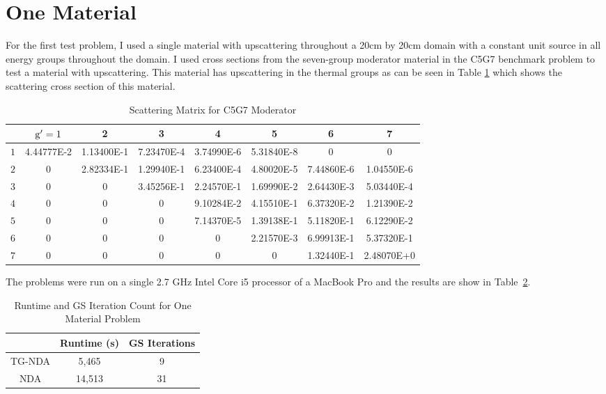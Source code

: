 \section{One Material}
For the first test problem, I used a single material with upscattering throughout a 20cm by 20cm domain with a constant unit source in all energy groups throughout the domain. 
 I used cross sections from the seven-group moderator material in the C5G7 benchmark problem \cite{C5G7} to test a material with upscattering.  This material has upscattering in the thermal groups as can be seen in Table \ref{table:modxs} which shows the scattering cross section of this material.
 \begin{table}[!htb]
\small
\centering
\caption{Scattering Matrix for C5G7 Moderator}
    \label{tab:two}
\begin{center}
    \begin{tabular}{|c|c|c|c|c|c|c|c|}
\hline
 & $\mathrm{g}'=1$ & 2 & 3 & 4 & 5 & 6 & 7 \\ 
\hline
 $1$ & 4.44777E-2 &  1.13400E-1 & 7.23470E-4 & 3.74990E-6 & 5.31840E-8     &  0     &    0  \\
\hline
 $2$  & 0       &    2.82334E-1 & 1.29940E-1 & 6.23400E-4  & 4.80020E-5  & 7.44860E-6 &  1.04550E-6 \\
\hline
 $3$  & 0        &      0  &     3.45256E-1 & 2.24570E-1 & 1.69990E-2 & 2.64430E-3 & 5.03440E-4 \\
\hline
 $4$  & 0          &     0    &       0     &  9.10284E-2 & 4.15510E-1 & 6.37320E-2 & 1.21390E-2 \\
\hline
 $5$  & 0        &       0     &      0     & 7.14370E-5 & 1.39138E-1 & 5.11820E-1 & 6.12290E-2 \\
\hline
$6$  & 0        &       0   &    0      &  0     &  2.21570E-3 & 6.99913E-1 &  5.37320E-1 \\
\hline
$7$  & 0       &        0        &   0      &     0      &     0   &    1.32440E-1 & 2.48070E+0 \\
\hline
    \end{tabular}
\end{center}
\label{table:modxs}
\end{table}

The problems were run on a single 2.7 GHz Intel Core i5 processor of a MacBook Pro and the results are show in Table~\ref{tab:onemat}.
\begin{table}[!htb]
\centering
\caption{Runtime and GS Iteration Count for One Material Problem}
    \label{tab:onemat}
\begin{center}
    \begin{tabular}{|c|c|c|}
    \hline
    & Runtime (s) & GS Iterations \\
    \hline

    TG-NDA & 5,465 & 9 \\
    NDA & 14,513 & 31 \\
    \hline
    \end{tabular}
\end{center}
\end{table}

